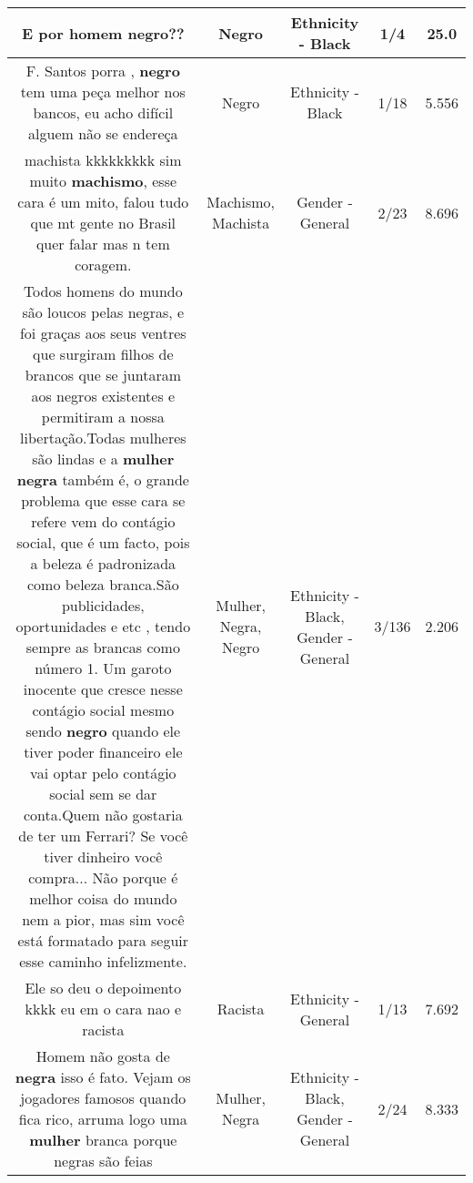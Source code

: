 \documentclass[11pt]{article}
\newlength\mylength
\begin{document}
\begin{center}
\begin{longtable}{|C{.65\mylength}|C{.30\mylength}|C{.12\mylength}|C{.12\mylength}|C{.12\mylength}|}
  \small E por homem \textbf{negro}??\normalsize   & Negro & Ethnicity - Black & 1/4 & 25.0 \\  \hline
  \small F. Santos porra  , \textbf{negro} tem uma peça melhor nos bancos, eu acho difícil alguem não se endereça\normalsize   & Negro & Ethnicity - Black & 1/18 & 5.556 \\  \hline
  \small machista kkkkkkkkk sim muito \textbf{machismo}, esse cara é um mito, falou tudo que mt gente no Brasil quer falar mas n tem coragem.\normalsize   & Machismo, Machista & Gender - General & 2/23 & 8.696 \\  \hline
  \small Todos homens do mundo são loucos pelas negras, e foi graças aos seus ventres que surgiram filhos de brancos que se juntaram aos negros existentes e permitiram a nossa libertação.Todas mulheres são lindas e a  \textbf{mulher} \textbf{negra} também é, o grande problema que esse cara se refere vem do contágio social, que é um facto, pois a beleza é padronizada como beleza branca.São publicidades, oportunidades e etc , tendo sempre as brancas como número 1. Um garoto inocente que cresce nesse contágio social mesmo sendo \textbf{negro} quando ele tiver poder financeiro ele vai optar pelo contágio social sem se dar conta.Quem não gostaria de ter um Ferrari? Se você tiver dinheiro você compra... Não porque é melhor coisa do mundo nem a pior, mas sim você está formatado para seguir esse caminho infelizmente.\normalsize   & Mulher, Negra, Negro & Ethnicity - Black, Gender - General & 3/136 & 2.206 \\  \hline
  \small Ele so deu o depoimento kkkk eu em o cara nao e racista\normalsize   & Racista & Ethnicity - General & 1/13 & 7.692 \\  \hline
  \small Homem não gosta de \textbf{negra} isso é fato. Vejam os jogadores famosos quando fica rico, arruma logo uma \textbf{mulher} branca porque negras são feias\normalsize   & Mulher, Negra & Ethnicity - Black, Gender - General & 2/24 & 8.333 \\  \hline

\end{longtable}
\end{center}
\end{document}

